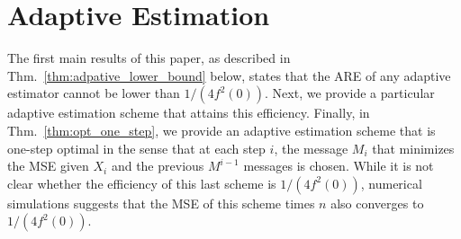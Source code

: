\documentclass[letterpaper, conference]{IEEEtran}      %
\begin{document}
\section{Adaptive Estimation \label{sec:sequential}}

The first main results of this paper, as described in Thm.~\ref{thm:adpative_lower_bound} below, states that the ARE of any adaptive estimator cannot be lower than $1/(4f^2(0))$. Next, we provide a particular adaptive estimation scheme that attains this efficiency. Finally, in Thm.~\ref{thm:opt_one_step}, we provide an adaptive estimation scheme that is one-step optimal in the sense that at each step $i$, the message $M_i$ that minimizes the MSE given $X_i$ and the previous $M^{i-1}$ messages is chosen. While it is not clear whether the efficiency of this last scheme is $1/(4f^2(0))$, numerical simulations suggests that the MSE of this scheme times $n$ also converges to $1/(4f^2(0))$.

%  
%
%
%
%  

\end{document}
